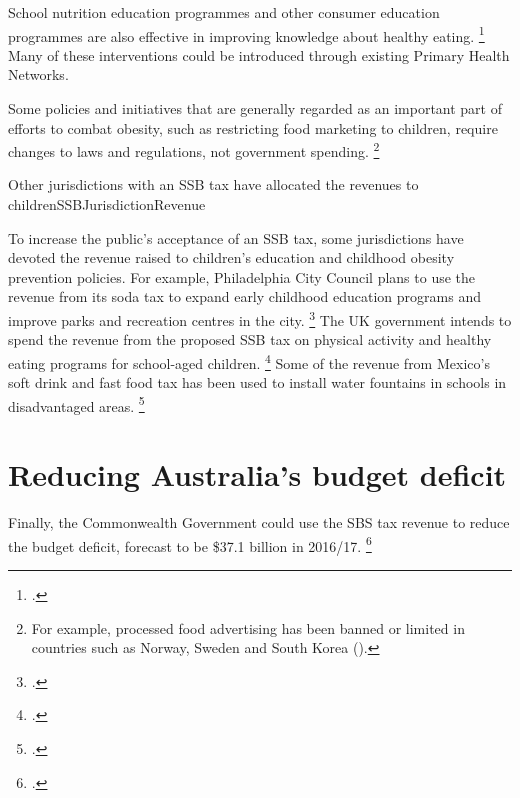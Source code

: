 \documentclass[embargoed]{grattan}
\begin{document}
School nutrition education programmes and other consumer education programmes are also effective in improving knowledge about healthy eating.%
\footcites{Research2007EvaluationNationalGo}{Capacci2012Policiespromotehealthy}{Ebbeling2002Childhoodobesitypublic}{Hawkes2013Promotinghealthydiets}{Hawkes2015Smartfoodpolicies}{Organization2016Reportcommissionending} Many of these interventions could be introduced through existing Primary Health Networks.

Some policies and initiatives that are generally regarded as an important part of efforts to combat obesity, such as restricting food marketing to children, require changes to laws and regulations, not government spending.%
\footnote{For example, processed food advertising has been banned or limited in countries such as Norway, Sweden and South Korea (\textcite{Cawley2015economyscalesselective}).}

\begin{verysmallbox}{Other jurisdictions with an SSB tax have allocated the revenues to children}{SSBJurisdictionRevenue}

To increase the public's acceptance of an SSB tax, some jurisdictions have devoted the revenue raised to children's education and childhood obesity prevention policies.
For example, Philadelphia City Council plans to use the revenue from its soda tax to expand early childhood education programs and improve parks and recreation centres in the city.%
\footcite{Nadolny2016Sodataxpasses} The UK government intends to spend the revenue from the proposed SSB tax on physical activity and healthy eating programs for school-aged children.%
\footcite{HMTreasurysugarlevy} Some of the revenue from Mexico's soft drink and fast food tax has been used to install water fountains in schools in disadvantaged areas.%
\footcite{Soares2016Puttingtaxesdiet}
\end{verysmallbox}

\section{Reducing Australia's budget deficit}\label{reducing-australias-budget-deficit}

Finally, the Commonwealth Government could use the SBS tax revenue to reduce the budget deficit, forecast to be \$37.1 billion in 2016/17.%
\footcite{Treasury2016201617BudgetBudget}
\end{document}
